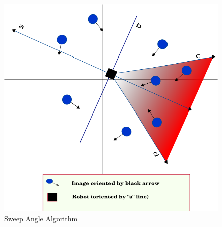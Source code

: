 \begin{figure}[!h]
  \begin{center}
    \includegraphics[width=400pt]{img/half_plan_finding.png} 
    \caption{Sweep Angle Algorithm}
    \label{fig:half_plan_finding}
  \end{center}
\end{figure}

